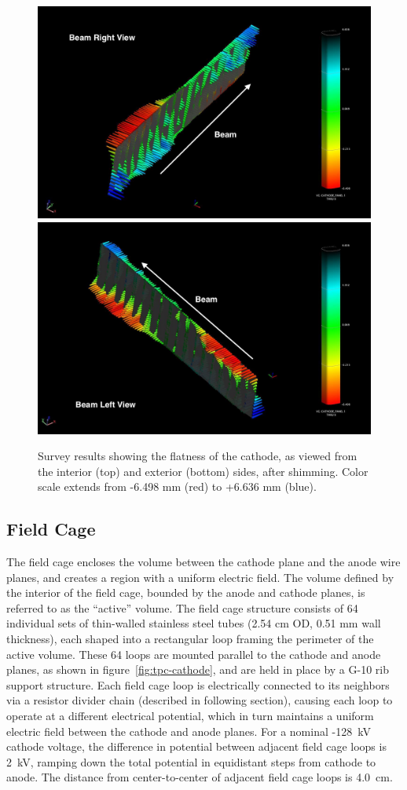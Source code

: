 \begin{figure}
\centering
\includegraphics[width=0.75\linewidth]{figures/Cathode_BeamRight.jpg}
\includegraphics[width=0.75\linewidth]{figures/Cathode_BeamLeft.jpg}
\caption{Survey results showing the flatness of the cathode, as viewed from the interior (top) and exterior (bottom) sides, after shimming.  Color scale extends from -6.498 mm (red) to +6.636 mm (blue).}
\label{fig:tpc-cathode-survey}
\end{figure}

\subsection{Field Cage}
The field cage encloses the volume between the cathode plane and the anode wire planes, and creates a region with a uniform electric field.  The volume defined by the interior of the field cage, bounded by the anode and cathode planes, is referred to as the ``active'' volume.   The field cage structure consists of 64 individual sets of thin-walled stainless steel tubes (2.54 cm OD, 0.51 mm wall thickness), each shaped into a rectangular loop framing the perimeter of the active volume. These 64 loops are mounted parallel to the cathode and anode planes, as shown in figure~\ref{fig:tpc-cathode}, and are held in place by a G-10 rib support structure. Each field cage loop is electrically connected to its neighbors via a resistor divider chain (described in following section), causing each loop to operate at a different electrical potential, which in turn maintains a uniform electric field between the cathode and anode planes. For a nominal -128~kV cathode voltage, the difference in potential between adjacent field cage loops is 2~kV, ramping down the total potential in equidistant steps from cathode to anode. The distance from center-to-center of adjacent field cage loops is 4.0~cm.

